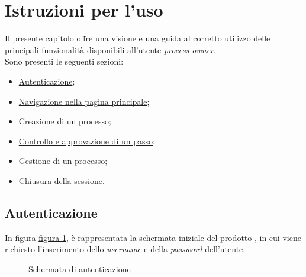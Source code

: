 \section{Istruzioni per l'uso}
\label{istruzioni}

Il presente capitolo offre una visione e una guida al corretto utilizzo delle principali funzionalità disponibili all'utente \textit{process owner}.\\
Sono presenti le seguenti sezioni:

\begin{itemize}
\item  \hyperref[autenticazione]{Autenticazione};
\item  \hyperref[home]{Navigazione nella pagina principale};
\item  \hyperref[creazione]{Creazione di un processo};
\item  \hyperref[controllo]{Controllo e approvazione di un passo};
\item  \hyperref[gestione]{Gestione di un processo};
\item  \hyperref[logout]{Chiusura della sessione}.
\end{itemize}

\pagebreak

\subsection{Autenticazione}
\label{autenticazione}

In figura \hyperref[fig:Flogin]{figura \ref{fig:Flogin}}, è rappresentata la schermata iniziale del prodotto \progetto{}, in cui viene richiesto l'inserimento dello \textit{username} e della \textit{password} dell'utente.

\begin{figure}[H] \centering 
{} \caption{Schermata di autenticazione}
\label{fig:Flogin}
\end{figure}

